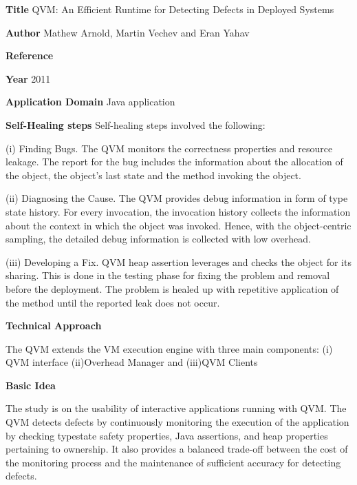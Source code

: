 \begin{compactitem}

\item[\textbf{Title}]QVM: An Efficient Runtime for Detecting Defects in Deployed Systems

\item[\textbf{Author}]
Mathew Arnold, Martin Vechev and Eran Yahav

\item[\textbf{Reference}] 

\cite{mathew_arnold_qvm:_2008}

\item[\textbf{Year}] 2011

\item[\textbf{Application Domain}] Java application


\item[\textbf{Self-Healing steps}] Self-healing steps involved the following:

(i)	Finding Bugs.
The QVM monitors the correctness properties and resource leakage. The report for the bug includes the information about the allocation of the object, the object’s last state and the method invoking the object.

(ii) Diagnosing the Cause.
The QVM provides debug information in form of type state history. For every invocation, the invocation history collects the information about the context in which the object was invoked. Hence, with the object-centric sampling, the detailed debug information is collected with low overhead.

(iii)	Developing a Fix.
QVM heap assertion leverages and checks the object for its sharing. This is done in the testing phase for fixing the problem and removal before the deployment. The problem is healed up with repetitive application of the method until the reported leak does not occur.    

\item[\textbf{Technical Approach}]

The QVM extends the VM execution engine with three main components: 
(i)	QVM interface
(ii)Overhead Manager and
(iii)QVM Clients 

\item[\textbf{Basic Idea}]  

The study is on the usability of interactive applications running with QVM. The QVM detects defects by continuously monitoring the execution of the application by checking typestate safety properties, Java assertions, and heap properties pertaining to ownership. It also provides a balanced trade-off between the cost of the monitoring process and the maintenance of sufficient accuracy for detecting defects.


\end{compactitem}
